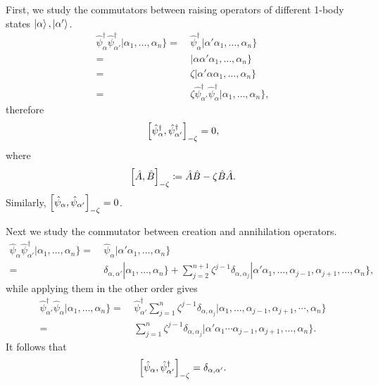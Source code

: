 \documentclass{article}
\theoremstyle{definition}
\theoremstyle{plain}
\numberwithin{equation}{section}
\begin{document}
First, we study the commutators 
between raising operators of different 
1-body states $\ket{\alpha},\ket{\alpha'}$.
\begin{align*}
    \hat{\psi}^{\dagger}_{\alpha}
    \hat{\psi}^{\dagger}_{\alpha'}
    |\alpha_1, \ldots ,\alpha_{n}\}
    =&\ 
    \hat{\psi}^{\dagger}_{\alpha}
    |\alpha' \alpha_1, \ldots ,\alpha_{n}\} \\
    =&\ 
    |\alpha \alpha' \alpha_1, \ldots ,\alpha_{n}\} \\
    =&\ 
    \zeta 
    |\alpha' \alpha \alpha_1, \ldots ,\alpha_{n}\} \\
    =&\ 
    \zeta
    \hat{\psi}^{\dagger}_{\alpha'}
    \hat{\psi}^{\dagger}_{\alpha}
    |\alpha_1, \ldots ,\alpha_{n}\},
\end{align*}
therefore 
\[
    \comm{\hat{\psi}^{\dagger}_{\alpha}}{
        \hat{\psi}^{\dagger}_{\alpha'}
    }_{-\zeta}
    = 0,
\]
where 
\[
    \comm{\hat{A}}{\hat{B}}_{-\zeta}
    \coloneqq
    \hat{A}\hat{B}-\zeta \hat{B} \hat{A}.
\]
Similarly, 
$\comm{\hat{\psi}_{\alpha}}{\hat{\psi}_{\alpha'}}_{-\zeta}=0$.


Next we study the commutator 
between creation and annihilation operators. 
\begin{align*}
    \hat{\psi}_{\alpha}
    \hat{\psi}^{\dagger}_{\alpha'}
    |\alpha_1, \ldots ,\alpha_n\}
    =&\ 
    \hat{\psi}_{\alpha}
    |\alpha'\alpha_1, \ldots ,\alpha_{n}\} \\
    =&\ 
    \delta_{\alpha,\alpha'}
    |\alpha_1, \ldots ,\alpha_{n}\}
    +
    \sum_{j=2}^{n+1}
    \zeta^{j-1}
    \delta_{\alpha,\alpha_{j}}
    |\alpha' \alpha_1, \ldots ,
    \alpha_{j-1},\alpha_{j+1}, \ldots ,\alpha_{n}\},
\end{align*}
while applying them in the other order gives
\begin{align*}
    \hat{\psi}^{\dagger}_{\alpha'}
    \hat{\psi}_{\alpha}
    |\alpha_1, \ldots ,\alpha_{n}\}
    =&\ 
    \hat{\psi}^{\dagger}_{\alpha'}
    \sum_{j=1}^{n}
    \zeta^{j-1}
    \delta_{\alpha,\alpha_{j}}
    |\alpha_1, \ldots ,\alpha_{j-1},\alpha_{j+1},
    \cdots ,\alpha_{n}\} \\
    =&\ 
    \sum_{j=1}^{n}\zeta^{j-1}\delta_{\alpha,\alpha_{j}}
    |\alpha'\alpha_{1}\cdots \alpha_{j-1},\alpha_{j+1}, \ldots ,\alpha_{n}\}.
\end{align*}
It follows that 
\[
    \comm{\hat{\psi}_{\alpha}}{\hat{\psi}^{\dagger}_{\alpha'}}
    _{-\zeta}
    =
    \delta_{\alpha,\alpha'}.
\]
\end{document}
